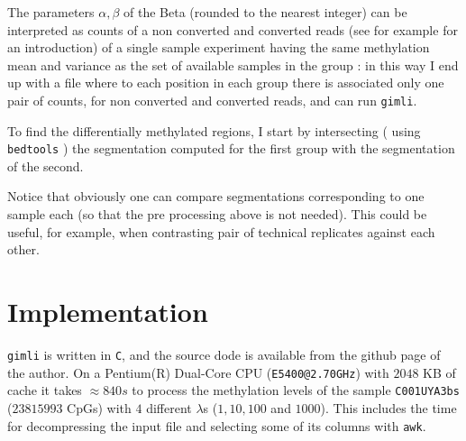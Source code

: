 \documentclass[12pt]{amsart}
\newcommand{\gimli}{\texttt{gimli}}
\begin{document}
The parameters $\alpha,\beta$ of the Beta (rounded to the nearest integer) 
can be interpreted as counts of 
a non converted and converted reads (see for example \cite{methyldiff} for an
introduction) of a single sample experiment having the same methylation 
mean and variance as  the set of available samples in the group : in this
way I end up with a file where to each position in each group there is associated only one
pair of counts, for non converted and converted reads, and can run \gimli{}.

To find the differentially methylated regions, I start by intersecting
( using \texttt{bedtools}\cite{bedtools} ) the segmentation computed for 
the first group with the segmentation of the second. 

Notice that obviously one can compare segmentations corresponding to one sample
each (so that the pre processing above is not needed). 
This could be useful, for example, 
when contrasting pair of technical replicates 
against each other.

\section{Implementation}

\gimli{} is written in \texttt{C}, and the source
dode is available from the github page of the author. 
On a Pentium(R) Dual-Core  CPU (\texttt{E5400@2.70GHz})
with $2048$ KB of cache it takes $\approx 840s$ to process the 
methylation levels of the sample \texttt{C001UYA3bs} ($23815993$ CpGs) 
with $4$ different $\lambda$s ($1,10,100$ and $1000$).
This includes the time for decompressing the input file and selecting some of its columns
with \texttt{awk}.



\end{document}
